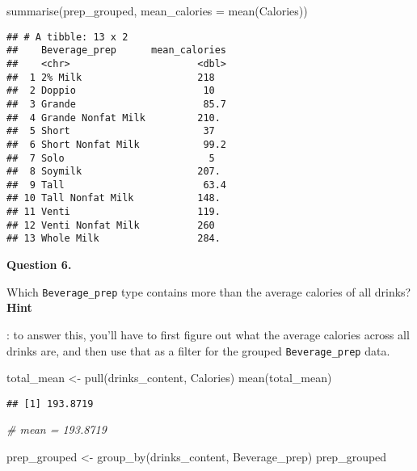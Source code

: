 \documentclass[
]{article}
\newenvironment{Shaded}{\begin{snugshade}}{\end{snugshade}}
\newcommand{\AttributeTok}[1]{\textcolor[rgb]{0.77,0.63,0.00}{#1}}
\newcommand{\CommentTok}[1]{\textcolor[rgb]{0.56,0.35,0.01}{\textit{#1}}}
\newcommand{\FunctionTok}[1]{\textcolor[rgb]{0.00,0.00,0.00}{#1}}
\newcommand{\NormalTok}[1]{#1}
\newcommand{\OtherTok}[1]{\textcolor[rgb]{0.56,0.35,0.01}{#1}}
\begin{document}
\begin{Shaded}
\begin{Highlighting}[]
\FunctionTok{summarise}\NormalTok{(prep\_grouped, }\AttributeTok{mean\_calories =} \FunctionTok{mean}\NormalTok{(Calories))}
\end{Highlighting}
\end{Shaded}

\begin{verbatim}
## # A tibble: 13 x 2
##    Beverage_prep      mean_calories
##    <chr>                      <dbl>
##  1 2% Milk                    218  
##  2 Doppio                      10  
##  3 Grande                      85.7
##  4 Grande Nonfat Milk         210. 
##  5 Short                       37  
##  6 Short Nonfat Milk           99.2
##  7 Solo                         5  
##  8 Soymilk                    207. 
##  9 Tall                        63.4
## 10 Tall Nonfat Milk           148. 
## 11 Venti                      119. 
## 12 Venti Nonfat Milk          260  
## 13 Whole Milk                 284.
\end{verbatim}

\textbf{Question 6.}

Which \texttt{Beverage\_prep} type contains more than the average
calories of all drinks?\\

\textbf{Hint}

: to answer this, you'll have to first figure out what the average
calories across all drinks are, and then use that as a filter for the
grouped \texttt{Beverage\_prep} data.

\begin{Shaded}
\begin{Highlighting}[]
\NormalTok{total\_mean }\OtherTok{\textless{}{-}} \FunctionTok{pull}\NormalTok{(drinks\_content, Calories)}
\FunctionTok{mean}\NormalTok{(total\_mean)}
\end{Highlighting}
\end{Shaded}

\begin{verbatim}
## [1] 193.8719
\end{verbatim}

\begin{Shaded}
\begin{Highlighting}[]
\CommentTok{\# mean = 193.8719}

\NormalTok{prep\_grouped }\OtherTok{\textless{}{-}} \FunctionTok{group\_by}\NormalTok{(drinks\_content, Beverage\_prep)}
\NormalTok{prep\_grouped}
\end{Highlighting}
\end{Shaded}
\end{document}
